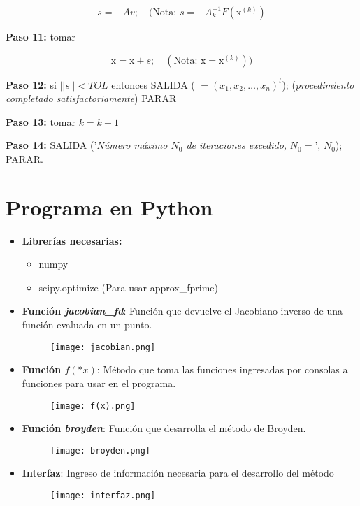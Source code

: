 \documentclass[12pt]{article}
\begin{document}
\begin{equation*}
    s = -A v; \quad (\text{Nota: } s = -A_k^{-1} F(\text{x}^{(k)})
\end{equation*}

\textbf{    Paso 11:} tomar

\begin{equation*}
    \text{x} = \text{x} + s; \quad (\text{Nota: } \text{x} = \text{x}^{(k)}))
\end{equation*}

\textbf{    Paso 12:} si $||s|| < \textit{TOL}$ entonces SALIDA ( $= (x_1, x_2, \ldots, x_n)^t$); (\textit{procedimiento completado satisfactoriamente}) PARAR

\textbf{    Paso 13:} tomar $k = k + 1$

\textbf{Paso 14:} SALIDA ('\textit{Número máximo $N_0$ de iteraciones excedido, } $N_0 = $', $N_0$); PARAR.

\section{Programa en Python}
\begin{itemize}
    \item \textbf{Librerías necesarias: }
        \begin{itemize}
            \item numpy
            \item scipy.optimize (Para usar approx\_fprime)
        \end{itemize}
    \item \textbf{Función \textit{jacobian\_fd}}:
        Función que devuelve el Jacobiano inverso de una función evaluada en un punto.
        \begin{figure}[H]
            \centering
            \texttt{[image: jacobian.png]}
            \label{fig:enter-label}
        \end{figure}
    \item \textbf{Función $f(*x)$}: Método que toma las funciones ingresadas por consolas a funciones para usar en el programa.
        \begin{figure}[H]
            \centering
            \texttt{[image: f(x).png]}
            \label{fig:enter-label}
        \end{figure}
    \item \textbf{Función \textit{broyden}}: Función que desarrolla el método de Broyden.
        \begin{figure}[H]
            \centering
            \texttt{[image: broyden.png]}
            \label{fig:enter-label}
        \end{figure}
    \item \textbf{Interfaz}: Ingreso de información necesaria para el desarrollo del método
        \begin{figure}[H]
            \centering
            \texttt{[image: interfaz.png]}
            \label{fig:enter-label}
        \end{figure}
\end{itemize}
\end{document}
